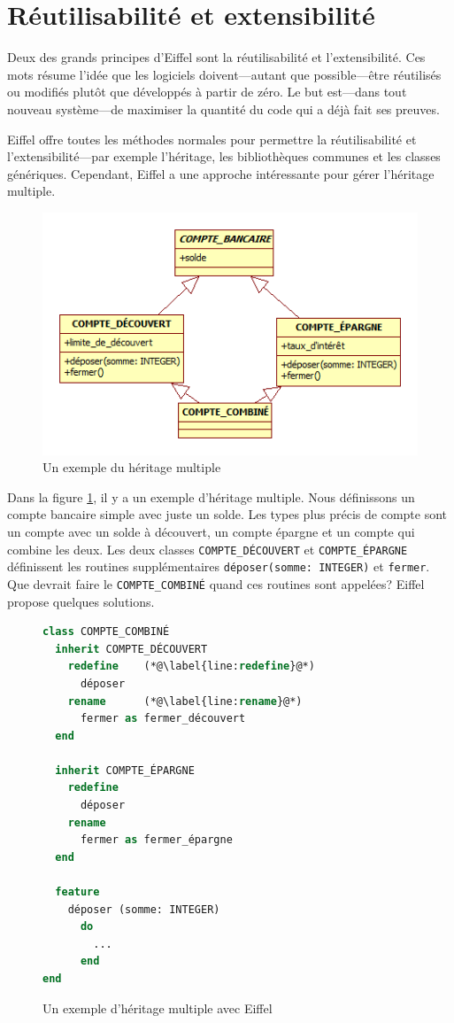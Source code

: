 \documentclass[french]{report}
\begin{document}
\section{Réutilisabilité et extensibilité}

Deux des grands principes d'Eiffel sont la réutilisabilité et l'extensibilité. Ces mots résume l'idée que les logiciels doivent---autant que possible---être réutilisés ou modifiés plutôt que développés à partir de zéro. Le but est---dans tout nouveau système---de maximiser la quantité du code qui a déjà fait ses preuves.

Eiffel offre toutes les méthodes normales pour permettre la réutilisabilité et l'extensibilité---par exemple l'héritage, les bibliothèques communes et les classes génériques. Cependant, Eiffel a une approche intéressante pour gérer l'héritage multiple.

\begin{figure}[h]
	\centering
	\includegraphics[width=0.7\linewidth]{multiple_inheritance}
	\caption{Un exemple du héritage multiple}
	\label{fig:multiple-inheritance}
\end{figure}

Dans la figure \ref{fig:multiple-inheritance}, il y a un exemple d'héritage multiple. Nous définissons un compte bancaire simple avec juste un solde. Les types plus précis de compte sont un compte avec un solde à découvert, un compte épargne et un compte qui combine les deux. Les deux classes \texttt{COMPTE\_DÉCOUVERT} et \texttt{COMPTE\_ÉPARGNE} définissent les routines supplémentaires \texttt{déposer(somme: INTEGER)} et \texttt{fermer}. Que devrait faire le \texttt{COMPTE\_COMBINÉ} quand ces routines sont appelées? Eiffel propose quelques solutions.


\begin{figure}[h]
	\begin{lstlisting}[language=Eiffel]
class COMPTE_COMBINÉ
  inherit COMPTE_DÉCOUVERT
    redefine	(*@\label{line:redefine}@*)
      déposer
    rename		(*@\label{line:rename}@*)
      fermer as fermer_découvert
  end
  
  inherit COMPTE_ÉPARGNE
    redefine
      déposer
    rename
      fermer as fermer_épargne
  end
  
  feature
    déposer (somme: INTEGER)
      do
        ...
      end
end
	\end{lstlisting}
	
	\caption{Un exemple d'héritage multiple avec Eiffel}
	\label{fig:multiple-inheritance-code}
\end{figure}
\end{document}

